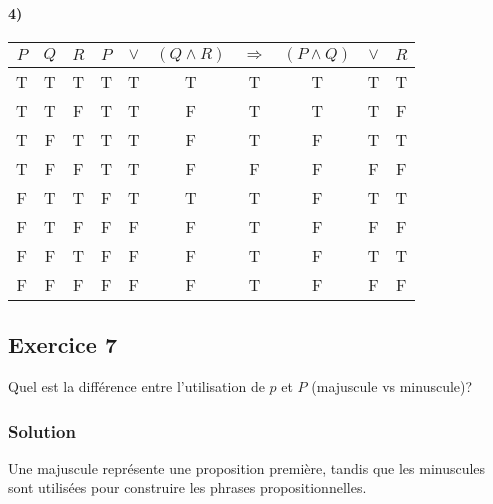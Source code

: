     \paragraph{4)}
    \begin{center}
    	\begin{tabular}{ccc|ccccccc}
    		$P$ & $Q$ & $R$ & $P$ & $\lor$ & $(Q \land R)$ & $\Rightarrow$ & $(P \land Q)$ & $\lor$ & $R$ \\
    		\hline
    		T & T & T & T & T & T & \color{red}T & T & T & T\\
    		T & T & F & T & T & F & \color{red}T & T & T & F\\
    		T & F & T & T & T & F & \color{red}T & F & T & T\\
    		T & F & F & T & T & F & \color{red}F & F & F & F\\
    		F & T & T & F & T & T & \color{red}T & F & T & T\\
    		F & T & F & F & F & F & \color{red}T & F & F & F\\
    		F & F & T & F & F & F & \color{red}T & F & T & T\\
    		F & F & F & F & F & F & \color{red}T & F & F & F\\
    	\end{tabular}
    \end{center}

\subsection*{Exercice 7}
Quel est la différence entre l'utilisation de $p$ et $P$ (majuscule vs minuscule)?


\subsubsection*{Solution}
    Une majuscule représente une proposition première, tandis que les minuscules sont utilisées pour construire les phrases propositionnelles.\\

